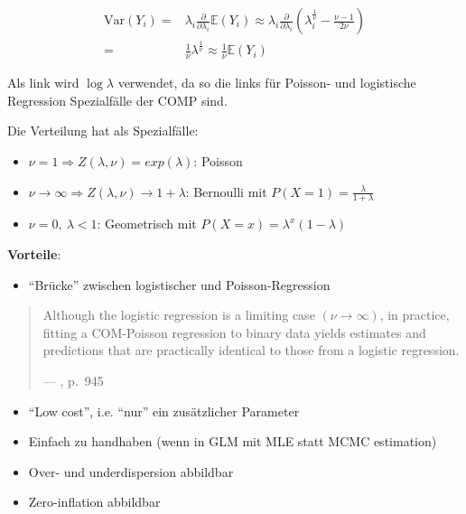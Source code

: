 \documentclass[ngerman,a4paper,]{scrartcl}
\providecommand{\tightlist}{%
  \setlength{\itemsep}{0pt}\setlength{\parskip}{0pt}}
\theoremstyle{definition}
\theoremstyle{definition}
\theoremstyle{definition}
\theoremstyle{remark}
\begin{document}
\begin{align*}
  \mathrm{Var}(Y_i) =& \lambda_i \frac{\partial}{\partial \lambda_i} \mathbb{E}(Y_i)
            \approx \lambda_i \frac{\partial}{\partial \lambda_i} \left( \lambda_i^{\frac{1}{\nu}} - \frac{\nu - 1}{2 \nu} \right) \\
                  =& \frac{1}{\nu} \lambda^{\frac{1}{\nu}}
           \approx \frac{1}{\nu} \mathbb{E}(Y_i)
\end{align*}

Als link wird \(\log \lambda\) verwendet, da so die links für Poisson- und logistische Regression Spezialfälle der COMP sind.

Die Verteilung hat als Spezialfälle:

\begin{itemize}
\tightlist
\item
  \(\nu = 1 \Longrightarrow Z(\lambda, \nu) = exp(\lambda)\): Poisson
\item
  \(\nu \to \infty \Longrightarrow Z(\lambda, \nu) \to 1 + \lambda\): Bernoulli mit \(P(X = 1) = \frac{\lambda}{1+\lambda}\)
\item
  \(\nu = 0,\ \lambda < 1\): Geometrisch mit \(P(X = x) = \lambda^x (1 - \lambda)\)
\end{itemize}

\textbf{Vorteile}:

\begin{itemize}
\tightlist
\item
  \enquote{Brücke} zwischen logistischer und Poisson-Regression \citep{sellers2010FlexibleRegression}
\end{itemize}

\begin{quote}
Although the logistic regression is a limiting case \((\nu \to \infty)\), in practice, fitting a COM-Poisson regression to binary data yields estimates and predictions that are practically identical to those from a logistic regression.

--- \citet{sellers2010FlexibleRegression}, p.~945
\end{quote}

\begin{itemize}
\tightlist
\item
  \enquote{Low cost}, i.e. \enquote{nur} ein zusätzlicher Parameter
\item
  Einfach zu handhaben (wenn in GLM mit MLE statt MCMC estimation)
\item
  Over- und underdispersion abbildbar
\item
  Zero-inflation abbildbar
\end{itemize}
\end{document}
